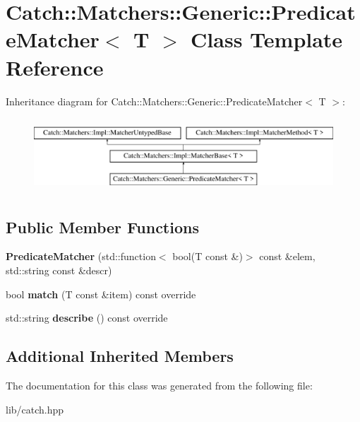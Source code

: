 \hypertarget{class_catch_1_1_matchers_1_1_generic_1_1_predicate_matcher}{}\section{Catch\+:\+:Matchers\+:\+:Generic\+:\+:Predicate\+Matcher$<$ T $>$ Class Template Reference}
\label{class_catch_1_1_matchers_1_1_generic_1_1_predicate_matcher}
Inheritance diagram for Catch\+:\+:Matchers\+:\+:Generic\+:\+:Predicate\+Matcher$<$ T $>$\+:\begin{figure}[H]
\begin{center}
\leavevmode
\includegraphics[height=2.790698cm]{class_catch_1_1_matchers_1_1_generic_1_1_predicate_matcher}
\end{center}
\end{figure}
\subsection*{Public Member Functions}
\begin{DoxyCompactItemize}
\item 
\mbox{\label{class_catch_1_1_matchers_1_1_generic_1_1_predicate_matcher_a57d53ef028c2f7b92b016f627f91aa76}} 
{\bfseries Predicate\+Matcher} (std\+::function$<$ bool(T const \&)$>$ const \&elem, std\+::string const \&descr)
\item 
\mbox{\label{class_catch_1_1_matchers_1_1_generic_1_1_predicate_matcher_a2ec0e8ec19c4c5e26271d59a06a62b52}} 
bool {\bfseries match} (T const \&item) const override
\item 
\mbox{\label{class_catch_1_1_matchers_1_1_generic_1_1_predicate_matcher_af7d59e94892cc09471bbaefac4c889fd}} 
std\+::string {\bfseries describe} () const override
\end{DoxyCompactItemize}
\subsection*{Additional Inherited Members}


The documentation for this class was generated from the following file\+:\begin{DoxyCompactItemize}
\item 
lib/catch.\+hpp\end{DoxyCompactItemize}
